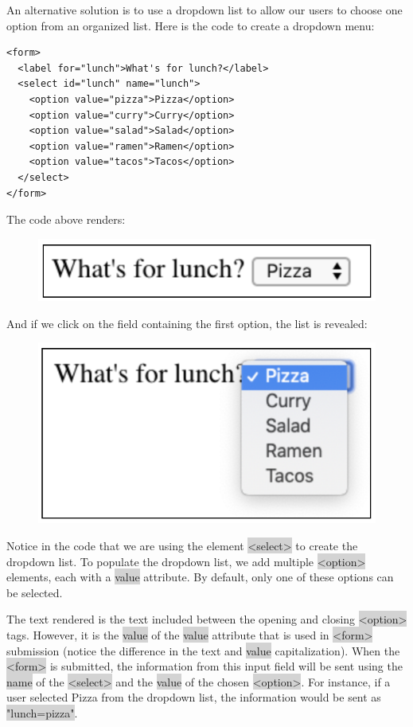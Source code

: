 \documentclass[11pt]{article}
\begin{document}
An alternative solution is to use a dropdown list to allow our users to choose one option from an organized list. Here is the code to create a dropdown menu:
\begin{lstlisting}
<form>
  <label for="lunch">What's for lunch?</label>
  <select id="lunch" name="lunch">
    <option value="pizza">Pizza</option>
    <option value="curry">Curry</option>
    <option value="salad">Salad</option>
    <option value="ramen">Ramen</option>
    <option value="tacos">Tacos</option>
  </select>
</form>
\end{lstlisting}
The code above renders:
\begin{figure}[H]
\includegraphics[scale = 0.5]{3_11}
\centering
\end{figure}
\vspace{-4mm}
And if we click on the field containing the first option, the list is revealed:
\begin{figure}[H]
\includegraphics[scale = 0.5]{3_12}
\centering
\end{figure}
\vspace{-4mm}
Notice in the code that we are using the element \colorbox{lightgray}{<select>} to create the dropdown list. To populate the dropdown list, we add multiple \colorbox{lightgray}{<option>} elements, each with a \colorbox{lightgray}{value} attribute. By default, only one of these options can be selected.

The text rendered is the text included between the opening and closing \colorbox{lightgray}{<option>} tags. However, it is the \colorbox{lightgray}{value} of the \colorbox{lightgray}{value} attribute that is used in \colorbox{lightgray}{<form>} submission (notice the difference in the text and \colorbox{lightgray}{value} capitalization). When the \colorbox{lightgray}{<form>} is submitted, the information from this input field will be sent using the \colorbox{lightgray}{name} of the \colorbox{lightgray}{<select>} and the \colorbox{lightgray}{value} of the chosen \colorbox{lightgray}{<option>}. For instance, if a user selected Pizza from the dropdown list, the information would be sent as \colorbox{lightgray}{"lunch=pizza"}.
\end{document}
